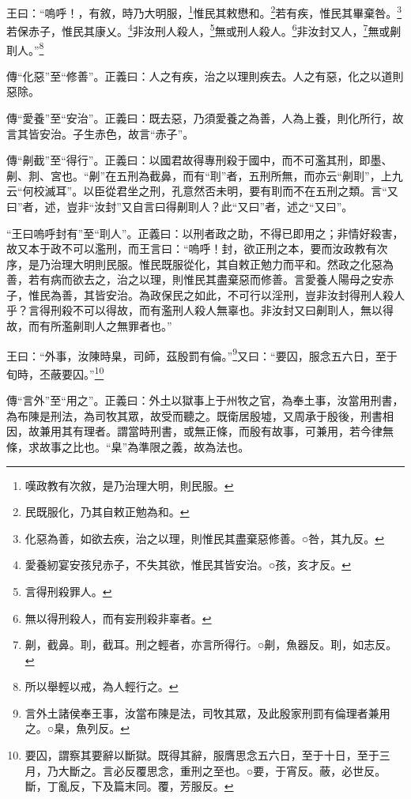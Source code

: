 王曰：“嗚呼！，有敘，時乃大明服，\footnote{嘆政教有次敘，是乃治理大明，則民服。}惟民其敕懋和。\footnote{民既服化，乃其自敕正勉為和。}若有疾，惟民其畢棄咎。\footnote{化惡為善，如欲去疾，治之以理，則惟民其盡棄惡修善。○咎，其九反。}若保赤子，惟民其康乂。\footnote{愛養紉宴安孩兒赤子，不失其欲，惟民其皆安治。○孩，亥才反。}非汝刑人殺人，\footnote{言得刑殺罪人。}無或刑人殺人。\footnote{無以得刑殺人，而有妄刑殺非辜者。}非汝封又人，\footnote{劓，截鼻。刵，截耳。刑之輕者，亦言所得行。○劓，魚器反。刵，如志反。}無或劓刵人。”\footnote{所以舉輕以戒，為人輕行之。}


{\noindent\zhuan{}\fzbyks 傳“化惡”至“修善”。正義曰：人之有疾，治之以理則疾去。人之有惡，化之以道則惡除。 \par}

{\noindent\zhuan{}\fzbyks 傳“愛養”至“安治”。正義曰：既去惡，乃須愛養之為善，人為上養，則化所行，故言其皆安治。子生赤色，故言“赤子”。 \par}

{\noindent\zhuan{}\fzbyks 傳“劓截”至“得行”。正義曰：以國君故得專刑殺于國中，而不可濫其刑，即墨、劓、剕、宮也。“劓”在五刑為截鼻，而有“刵”者，五刑所無，而亦云“劓刵”，上九云“何校滅耳”。以臣從君坐之刑，孔意然否未明，要有刵而不在五刑之類。言“又曰”者，述，豈非“汝封”又自言曰得劓刵人？此“又曰”者，述之“又曰”。 \par}

{\noindent\shu{}\fzkt “王曰嗚呼封有”至“刵人”。正義曰：以刑者政之助，不得已即用之；非情好殺害，故又本于政不可以濫刑，而王言曰：“嗚呼！封，欲正刑之本，要而汝政教有次序，是乃治理大明則民服。惟民既服從化，其自敕正勉力而平和。然政之化惡為善，若有病而欲去之，治之以理，則惟民其盡棄惡而修善。言愛養人陽母之安赤子，惟民為善，其皆安治。為政保民之如此，不可行以淫刑，豈非汝封得刑人殺人乎？言得刑殺不可以得故，而有濫刑人殺人無辜也。非汝封又曰劓刵人，無以得故，而有所濫劓刵人之無罪者也。” \par}

王曰：“外事，汝陳時臬，司師，茲殷罰有倫。”\footnote{言外土諸侯奉王事，汝當布陳是法，司牧其眾，及此殷家刑罰有倫理者兼用之。○臬，魚列反。}又曰：“要囚，服念五六日，至于旬時，丕蔽要囚。”\footnote{要囚，謂察其要辭以斷獄。既得其辭，服膺思念五六日，至于十日，至于三月，乃大斷之。言必反覆思念，重刑之至也。○要，于宵反。蔽，必世反。斷，丁亂反，下及篇末同。覆，芳服反。}


{\noindent\zhuan{}\fzbyks 傳“言外”至“用之”。正義曰：外土以獄事上于州牧之官，為奉土事，汝當用刑書，為布陳是刑法，為司牧其眾，故受而聽之。既衛居殷墟，又周承于殷後，刑書相因，故兼用其有理者。謂當時刑書，或無正條，而殷有故事，可兼用，若今律無條，求故事之比也。“臬”為準限之義，故為法也。 \par}

